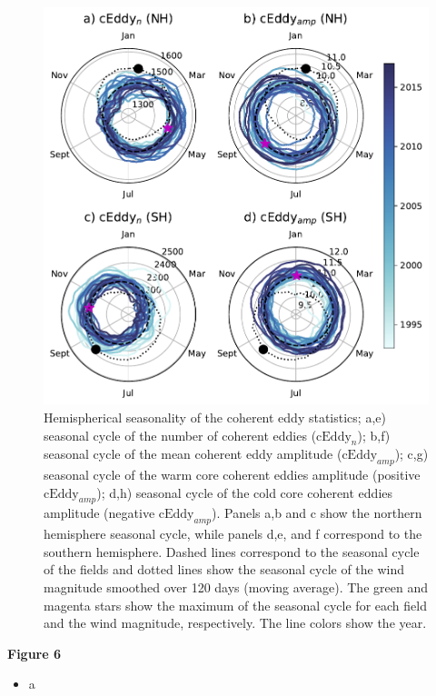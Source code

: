 \documentclass[draft,linenumbers]{agujournal2019}
\newcommand{\cEddy}{\textrm{cEddy}}
\begin{document}
	\begin{figure}
	    \centering
	    \includegraphics[width=1\textwidth]{figures/All_polar_plots_eddy_stats_polarity_V1.pdf}
	    \caption{Hemispherical seasonality of the coherent eddy statistics;
		a,e) seasonal cycle of the number of coherent eddies ($\cEddy_n$); b,f) seasonal cycle of the mean coherent eddy amplitude ($\cEddy_{amp}$); c,g) seasonal cycle of the warm core coherent eddies amplitude (positive $\cEddy_{amp}$); d,h) seasonal cycle of the cold core coherent eddies amplitude (negative $\cEddy_{amp}$). Panels a,b and c show the northern hemisphere seasonal cycle, while panels d,e, and f correspond to the southern hemisphere. Dashed lines correspond to the seasonal cycle of the fields and dotted lines show the seasonal cycle of the wind magnitude smoothed over 120 days (moving average). The green and magenta stars show the maximum of the seasonal cycle for each field and the wind magnitude, respectively. The line colors show the year.}
	    \label{fig:eddy_stats_polar}
	\end{figure}

	\textbf{Figure 6}
	\begin{itemize}
		\item a
	\end{itemize}
\end{document}
